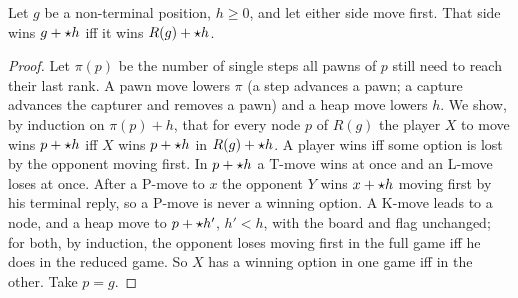 \begin{wallproof}
\begin{lemma}
Let $g$ be a non-terminal position, $h\ge0$, and let either side move first. That side wins $g+\mathord{\star h}$ iff it wins $R(g)+\mathord{\star h}$.
\end{lemma}
\begin{proof}
Let $\pi(p)$ be the number of single steps all pawns of $p$ still need to reach their last rank. A pawn move lowers $\pi$ (a step
advances a pawn; a capture advances the capturer and removes a pawn) and a heap move lowers $h$. We show, by induction on
$\pi(p)+h$, that for every node $p$ of $R(g)$ the player $X$ to move wins $p+\mathord{\star h}$ iff $X$ wins $p+\mathord{\star h}$ in $R(g)+\mathord{\star h}$. A player wins iff
some option is lost by the opponent moving first. In $p+\mathord{\star h}$ a T-move wins at once and an L-move loses at once. After a P-move to $x$
the opponent $Y$ wins $x+\mathord{\star h}$ moving first by his terminal reply, so a P-move is never a winning option. A K-move leads to a node, and a
heap move to $p+\mathord{\star h'}$, $h'<h$, with the board and flag unchanged; for both, by induction, the opponent loses moving first in the full
game iff he does in the reduced game. So $X$ has a winning option in one game iff in the other. Take $p=g$.
\end{proof}


\end{wallproof}
